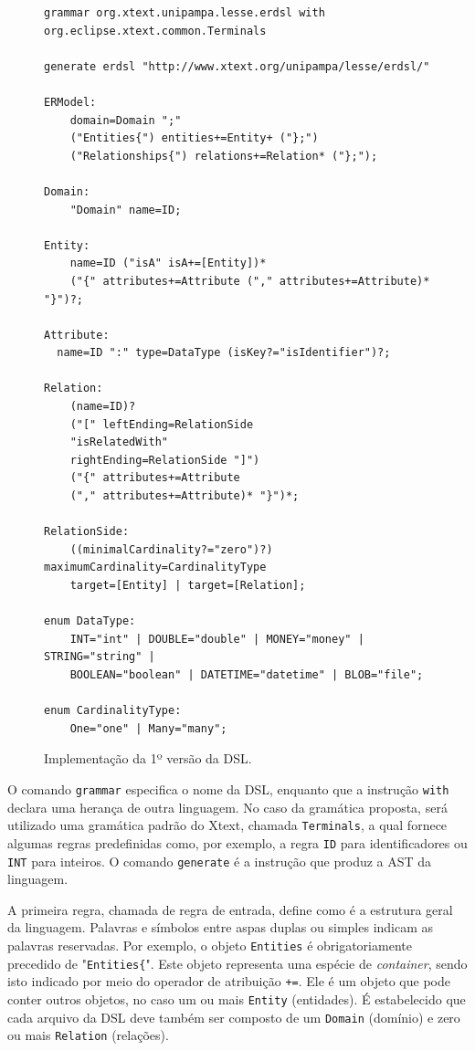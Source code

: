 \begin{figure}
    \centering
    \caption{Implementação da 1º versão da DSL.}
    \label{fig:DSLvs1}
    \begin{scriptsize}
    \begin{lstlisting}[language = Xtext , frame = trbl]
grammar org.xtext.unipampa.lesse.erdsl with org.eclipse.xtext.common.Terminals

generate erdsl "http://www.xtext.org/unipampa/lesse/erdsl/"

ERModel:
	domain=Domain ";"
	("Entities{") entities+=Entity+ ("};")
	("Relationships{") relations+=Relation* ("};");

Domain:
	"Domain" name=ID;

Entity:
	name=ID ("isA" isA+=[Entity])* 
	("{" attributes+=Attribute ("," attributes+=Attribute)* "}")?;

Attribute:
  name=ID ":" type=DataType (isKey?="isIdentifier")?;

Relation:
	(name=ID)? 
	("[" leftEnding=RelationSide 
	"isRelatedWith" 
	rightEnding=RelationSide "]")
	("{" attributes+=Attribute 
	("," attributes+=Attribute)* "}")*;
	
RelationSide:
	((minimalCardinality?="zero")?)	maximumCardinality=CardinalityType	
	target=[Entity] | target=[Relation];

enum DataType:
	INT="int" | DOUBLE="double" | MONEY="money" | STRING="string" | 
	BOOLEAN="boolean" | DATETIME="datetime" | BLOB="file";

enum CardinalityType:
	One="one" | Many="many";
    \end{lstlisting}
    \end{scriptsize}    
\end{figure}


O comando \texttt{grammar} especifica o nome da \ac{DSL}, enquanto que a instrução \texttt{with} declara uma herança de outra linguagem. 
No caso da gramática proposta, será utilizado uma gramática padrão do Xtext, chamada \texttt{Terminals}, a qual fornece algumas regras predefinidas como, por exemplo, a regra \texttt{ID} para identificadores ou \texttt{INT} para inteiros. 
O comando \texttt{generate} é a instrução que produz a \ac{AST} da linguagem.

A primeira regra, chamada de regra de entrada, define como é a estrutura geral da linguagem. 
Palavras e símbolos entre aspas duplas ou simples indicam as palavras reservadas. 
Por exemplo, o objeto \texttt{Entities} é obrigatoriamente precedido de "\texttt{Entities\{}". 
Este objeto representa uma espécie de \textit{container}, sendo isto indicado por meio do operador de atribuição \texttt{+=}. 
Ele é um objeto que pode conter outros objetos, no caso um ou mais \texttt{Entity} (entidades). 
É estabelecido que cada arquivo da \ac{DSL} deve também ser composto de um \texttt{Domain} (domínio) e zero ou mais \texttt{Relation} (relações). 


